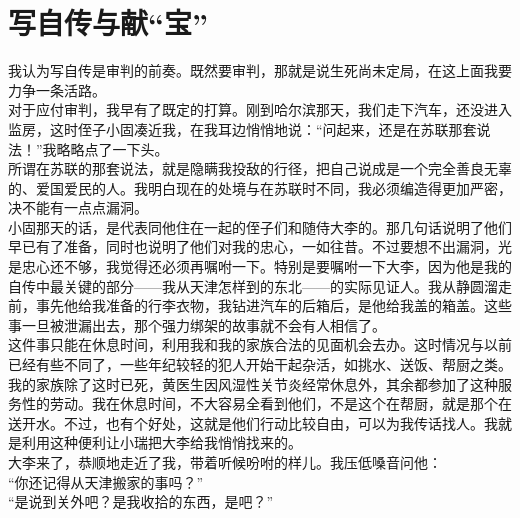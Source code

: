 \fancyhead[RO]{} %
\fancyhead[LE]{} %
\chapter*{写自传与献“宝”}
\thispagestyle{empty}
我认为写自传是审判的前奏。既然要审判，那就是说生死尚未定局，在这上面我要力争一条活路。\\

对于应付审判，我早有了既定的打算。刚到哈尔滨那天，我们走下汽车，还没进入监房，这时侄子小固凑近我，在我耳边悄悄地说：“问起来，还是在苏联那套说法！”我略略点了一下头。\\

所谓在苏联的那套说法，就是隐瞒我投敌的行径，把自己说成是一个完全善良无辜的、爱国爱民的人。我明白现在的处境与在苏联时不同，我必须编造得更加严密，决不能有一点点漏洞。\\

小固那天的话，是代表同他住在一起的侄子们和随侍大李的。那几句话说明了他们早已有了准备，同时也说明了他们对我的忠心，一如往昔。不过要想不出漏洞，光是忠心还不够，我觉得还必须再嘱咐一下。特别是要嘱咐一下大李，因为他是我的自传中最关键的部分——我从天津怎样到的东北——的实际见证人。我从静圆溜走前，事先他给我准备的行李衣物，我钻进汽车的后箱后，是他给我盖的箱盖。这些事一旦被泄漏出去，那个强力绑架的故事就不会有人相信了。\\

这件事只能在休息时间，利用我和我的家族合法的见面机会去办。这时情况与以前已经有些不同了，一些年纪较轻的犯人开始干起杂活，如挑水、送饭、帮厨之类。我的家族除了这时已死，黄医生因风湿性关节炎经常休息外，其余都参加了这种服务性的劳动。我在休息时间，不大容易全看到他们，不是这个在帮厨，就是那个在送开水。不过，也有个好处，这就是他们行动比较自由，可以为我传话找人。我就是利用这种便利让小瑞把大李给我悄悄找来的。\\

大李来了，恭顺地走近了我，带着听候吩咐的样儿。我压低嗓音问他：\\

“你还记得从天津搬家的事吗？”\\

“是说到关外吧？是我收拾的东西，是吧？”\\

